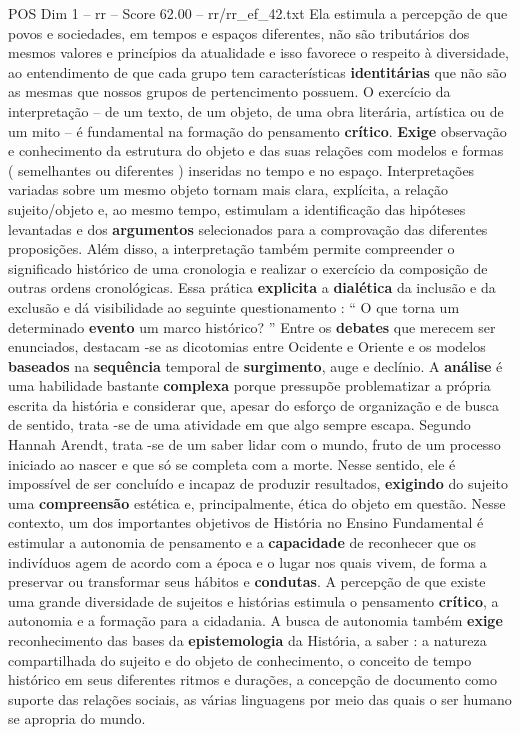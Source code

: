 \begin{textsample}{POS Dim 1 – rr – Score 62.00 – rr/rr\_ef\_42.txt}
Ela estimula a percepção de que povos e sociedades, em tempos e espaços diferentes, não são tributários dos mesmos valores e princípios da atualidade e isso favorece o respeito à diversidade, ao entendimento de que cada grupo tem características \textbf{identitárias} que não são as mesmas que nossos grupos de pertencimento possuem.
O exercício da interpretação – de um texto, de um objeto, de uma obra literária, artística ou de um mito – é fundamental na formação do pensamento \textbf{crítico}. \textbf{Exige} observação e conhecimento da estrutura do objeto e das suas relações com modelos e formas ( semelhantes ou diferentes ) inseridas no tempo e no espaço.
Interpretações variadas sobre um mesmo objeto tornam mais clara, explícita, a relação sujeito/objeto e, ao mesmo tempo, estimulam a identificação das hipóteses levantadas e dos \textbf{argumentos} selecionados para a comprovação das diferentes proposições.
Além disso, a interpretação também permite compreender o significado histórico de uma cronologia e realizar o exercício da composição de outras ordens cronológicas.
Essa prática \textbf{explicita} a \textbf{dialética} da inclusão e da exclusão e dá visibilidade ao seguinte questionamento : “ O que torna um determinado \textbf{evento} um marco histórico? ” Entre os \textbf{debates} que merecem ser enunciados, destacam -se as dicotomias entre Ocidente e Oriente e os modelos \textbf{baseados} na \textbf{sequência} temporal de \textbf{surgimento}, auge e declínio.
A \textbf{análise} é uma habilidade bastante \textbf{complexa} porque pressupõe problematizar a própria escrita da história e considerar que, apesar do esforço de organização e de busca de sentido, trata -se de uma atividade em que algo sempre escapa.
Segundo Hannah Arendt, trata -se de um saber lidar com o mundo, fruto de um processo iniciado ao nascer e que só se completa com a morte.
Nesse sentido, ele é impossível de ser concluído e incapaz de produzir resultados, \textbf{exigindo} do sujeito uma \textbf{compreensão} estética e, principalmente, ética do objeto em questão.
Nesse contexto, um dos importantes objetivos de História no Ensino Fundamental é estimular a autonomia de pensamento e a \textbf{capacidade} de reconhecer que os indivíduos agem de acordo com a época e o lugar nos quais vivem, de forma a preservar ou transformar seus hábitos e \textbf{condutas}.
A percepção de que existe uma grande diversidade de sujeitos e histórias estimula o pensamento \textbf{crítico}, a autonomia e a formação para a cidadania.
A busca de autonomia também \textbf{exige} reconhecimento das bases da \textbf{epistemologia} da História, a saber : a natureza compartilhada do sujeito e do objeto de conhecimento, o conceito de tempo histórico em seus diferentes ritmos e durações, a concepção de documento como suporte das relações sociais, as várias linguagens por meio das quais o ser humano se apropria do mundo.

\end{textsample}
